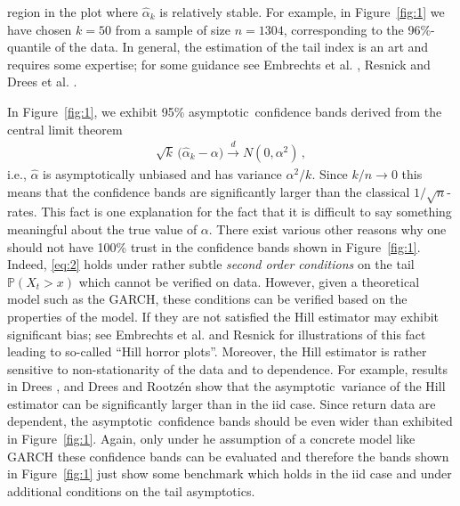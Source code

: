 \documentclass[11pt,a4]{amsart}
\newcommand{\clt}{central limit theorem}
\newcommand{\asy}{asymptotic}
\newcommand{\beam}{\begin{eqnarray}}
\newcommand{\eeam}{\end{eqnarray}\noindent}
\newcommand{\std}{\stackrel{d}{\rightarrow}}
\renewcommand{\P }{{\mathbb P}}
\newcommand{\1}{{\mathbf 1}}
\begin{document}
region in the plot where $\hat \alpha_k$ is relatively
stable. For example, in Figure~\ref{fig:1} we have chosen $k=50$ from
a sample of size $n=1304$, corresponding to the 96\%-quantile of the
data. In general, the estimation of the tail index is an art and
requires some expertise; for some guidance
see Embrechts et al. \cite{embrechts:klueppelberg:mikosch:1997},
Resnick \cite{resnick:2007} and Drees et al. 
\cite{drees:resnick:2000}. 
\par
In Figure~\ref{fig:1},
we exhibit 95\% \asy\ confidence bands derived from  the \clt
\beam\label{eq:2}
\sqrt k\, \big(\hat \alpha_k - \alpha\big) \std N(0, \alpha^2)\,,
\eeam
i.e., $\hat \alpha$ is \asy ally unbiased and has variance
$\alpha^2/k$. Since $k/n\to 0$ this means that the 
confidence bands are significantly larger than the classical
$1/\sqrt{n}$-rates. This fact is one explanation for the fact that it is
difficult to say something meaningful about the true value of
$\alpha$. There exist various other reasons why one should
not have 100\% trust in the confidence bands shown in
Figure~\ref{fig:1}. Indeed, \eqref{eq:2}
holds under rather subtle {\em second order conditions} on the tail
$\P(X_t>x)$ which cannot be verified on data. However, 
given a theoretical model such as the GARCH, these conditions can be
verified based on the properties of the model. If they are not satisfied the 
Hill estimator may exhibit significant bias; see Embrechts et
al. \cite{embrechts:klueppelberg:mikosch:1997} and Resnick \cite{resnick:1987} for illustrations 
of this fact leading to so-called ``Hill horror plots''. Moreover, the
Hill estimator is rather sensitive to non-stationarity 
of the data and to dependence. For example, results in Drees \cite{drees:2008}, and Drees and
Rootz\'en \cite{drees:rootzen:2010} show that the \asy\ variance of the
Hill estimator can be significantly larger than in the iid case. 
Since return data are dependent, the \asy\ confidence bands should be
even wider than exhibited in Figure~\ref{fig:1}. 
Again, only under he assumption of a concrete model like GARCH these
confidence bands can be evaluated and therefore the bands shown in Figure~\ref{fig:1}
just show some benchmark which holds in the iid case and under additional conditions on the tail \asy s.
\end{document}
